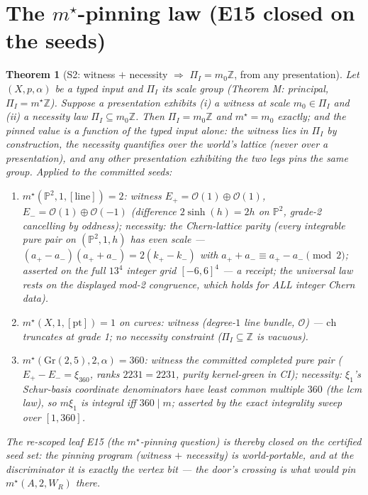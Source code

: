 \documentclass[11pt]{article}
\newtheorem{theorem}{Theorem}
\begin{document}
\section{The $m^\star$-pinning law (E15 closed on the seeds)}

\begin{theorem}[S2: witness $+$ necessity $\Rightarrow$ $\Pi_I=m_0\mathbb Z$, from any presentation]
\label{thm:s2}
Let $(X,p,\alpha)$ be a typed input and $\Pi_I$ its scale group (Theorem M:
principal, $\Pi_I=m^\star\mathbb Z$). Suppose a presentation exhibits
\emph{(i)} a witness at scale $m_0\in\Pi_I$ and \emph{(ii)} a necessity law
$\Pi_I\subseteq m_0\mathbb Z$. Then $\Pi_I=m_0\mathbb Z$ and
$m^\star=m_0$ \emph{exactly}; and the pinned value is a function of the typed
input alone: the witness lies in $\Pi_I$ by construction, the necessity
quantifies over the world's lattice (never over a presentation), and any other
presentation exhibiting the two legs pins the same group.
Applied to the committed seeds:
\begin{enumerate}
\item[\textup{(a)}] $m^\star(\mathbb P^2,1,[\mathrm{line}])=2$: witness
$E_+=\mathcal O(1)\oplus\mathcal O(1)$, $E_-=\mathcal O(1)\oplus\mathcal O(-1)$
(difference $2\sinh(h)=2h$ on $\mathbb P^2$, grade-2 cancelling by oddness);
necessity: the Chern-lattice parity (every integrable pure pair on
$(\mathbb P^2,1,h)$ has even scale --- $(a_+-a_-)(a_++a_-)=2(k_+-k_-)$ with
$a_++a_-\equiv a_+-a_-\pmod 2$; asserted on the full $13^4$ integer grid $[-6,6]^4$ --- a receipt; the universal law rests on the displayed mod-2 congruence, which holds for ALL integer Chern data).
\item[\textup{(b)}] $m^\star(X,1,[\mathrm{pt}])=1$ on curves: witness
(degree-$1$ line bundle, $\mathcal O$) --- $\mathrm{ch}$ truncates at grade 1;
no necessity constraint ($\Pi_I\subseteq\mathbb Z$ is vacuous).
\item[\textup{(c)}] $m^\star(\mathrm{Gr}(2,5),2,\alpha)=360$: witness the
committed completed pure pair ($E_+-E_-=\xi_{360}$, ranks $2231=2231$, purity
kernel-green in CI); necessity: $\xi_1$'s Schur-basis coordinate denominators
have least common multiple $360$ (the lcm law), so $m\xi_1$ is integral iff
$360\mid m$; asserted by the exact integrality sweep over $[1,360]$.
\end{enumerate}
The re-scoped leaf E15 (the $m^\star$-pinning question) is thereby
\emph{closed on the certified seed set}: the pinning program
(witness $+$ necessity) is world-portable, and at the discriminator it is
exactly the vertex bit --- the door's crossing is what would pin
$m^\star(A,2,W_R)$ there.
\end{theorem}
\end{document}
